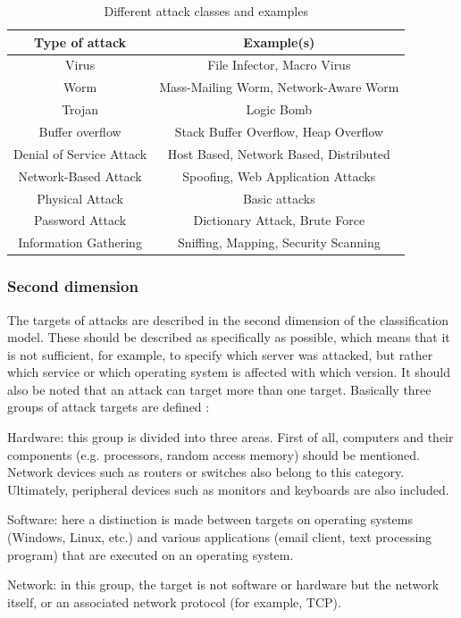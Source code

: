 \documentclass[conference]{IEEEtran}
\begin{document}
\begin{table}[htbp]
\caption{Different attack classes and examples \cite{b2}} 
\centering
\begin{tabular}{ | c | c | }
\hline
Type of attack & Example(s) \\
\hline
Virus & File Infector, Macro Virus \\
Worm & Mass-Mailing Worm, Network-Aware Worm \\
Trojan & Logic Bomb \\
Buffer overflow & Stack Buffer Overflow, Heap Overflow \\
Denial of Service Attack & Host Based, Network Based, Distributed \\
Network-Based Attack & Spoofing,  Web Application Attacks \\
Physical Attack & Basic attacks \\
Password Attack & Dictionary Attack, Brute Force \\
Information Gathering &	Sniffing, Mapping, Security Scanning \\
\hline
\end{tabular}
\label{table:attack-types}
\end{table}

\medskip \subsubsection{Second dimension}The targets of attacks are described in the second dimension of the classification model. These should be described as specifically as possible, which means that it is not sufficient, for example, to specify which server was attacked, but rather which service or which operating system is affected with which version. It should also be noted that an attack can target more than one target. Basically three groups of attack targets are defined \cite{b5}:

\smallskip Hardware: this group is divided into three areas. First of all, computers and their components (e.g. processors, random access memory) should be mentioned. Network devices such as routers or switches also belong to this category. Ultimately, peripheral devices such as monitors and keyboards are also included.

\smallskip Software: here a distinction is made between targets on operating systems (Windows, Linux, etc.) and various applications (email client, text processing program) that are executed on an operating system.

\smallskip Network: in this group, the target is not software or hardware but the network itself, or an associated network protocol (for example, TCP).
\end{document}

